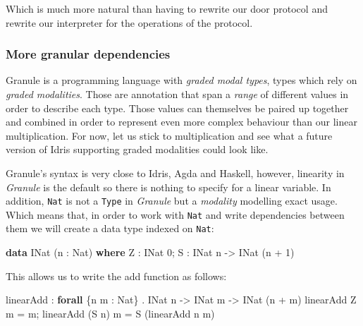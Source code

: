 \documentclass[
]{article}
\newenvironment{Shaded}{}{}
\newcommand{\DataTypeTok}[1]{\textcolor[rgb]{0.56,0.13,0.00}{#1}}
\newcommand{\DecValTok}[1]{\textcolor[rgb]{0.25,0.63,0.44}{#1}}
\newcommand{\KeywordTok}[1]{\textcolor[rgb]{0.00,0.44,0.13}{\textbf{#1}}}
\newcommand{\NormalTok}[1]{#1}
\newcommand{\OperatorTok}[1]{\textcolor[rgb]{0.40,0.40,0.40}{#1}}
\newcommand{\OtherTok}[1]{\textcolor[rgb]{0.00,0.44,0.13}{#1}}
\begin{document}
Which is much more natural than having to rewrite our door protocol and
rewrite our interpreter for the operations of the protocol.

\hypertarget{more-granular-dependencies}{%
\subsubsection{More granular
dependencies}\label{more-granular-dependencies}}

Granule is a programming language with \emph{graded modal types}, types
which rely on \emph{graded modalities}. Those are annotation that span a
\emph{range} of different values in order to describe each type. Those
values can themselves be paired up together and combined in order to
represent even more complex behaviour than our linear multiplication.
For now, let us stick to multiplication and see what a future version of
Idris supporting graded modalities could look like.

Granule's syntax is very close to Idris, Agda and Haskell, however,
linearity in \emph{Granule} is the default so there is nothing to
specify for a linear variable. In addition, \texttt{Nat} is not a
\texttt{Type} in \emph{Granule} but a \emph{modality} modelling exact
usage. Which means that, in order to work with \texttt{Nat} and write
dependencies between them we will create a data type indexed on
\texttt{Nat}:

\begin{Shaded}
\begin{Highlighting}[]
\KeywordTok{data} \DataTypeTok{INat}\NormalTok{ (n }\OperatorTok{:} \DataTypeTok{Nat}\NormalTok{) }\KeywordTok{where}
  \DataTypeTok{Z} \OperatorTok{:} \DataTypeTok{INat} \DecValTok{0}\NormalTok{;}
  \DataTypeTok{S} \OperatorTok{:} \DataTypeTok{INat}\NormalTok{ n }\OtherTok{{-}\textgreater{}} \DataTypeTok{INat}\NormalTok{ (n }\OperatorTok{+} \DecValTok{1}\NormalTok{)}
\end{Highlighting}
\end{Shaded}

This allows us to write the add function as follows:

\begin{Shaded}
\begin{Highlighting}[]
\NormalTok{linearAdd }\OperatorTok{:} \KeywordTok{forall}\NormalTok{ \{n m }\OperatorTok{:} \DataTypeTok{Nat}\NormalTok{\} }\OperatorTok{.} \DataTypeTok{INat}\NormalTok{ n }\OtherTok{{-}\textgreater{}} \DataTypeTok{INat}\NormalTok{ m }\OtherTok{{-}\textgreater{}} \DataTypeTok{INat}\NormalTok{ (n }\OperatorTok{+}\NormalTok{ m)}
\NormalTok{linearAdd }\DataTypeTok{Z}\NormalTok{ m }\OtherTok{=}\NormalTok{ m;}
\NormalTok{linearAdd (}\DataTypeTok{S}\NormalTok{ n) m }\OtherTok{=} \DataTypeTok{S}\NormalTok{ (linearAdd n m)}
\end{Highlighting}
\end{Shaded}
\end{document}

